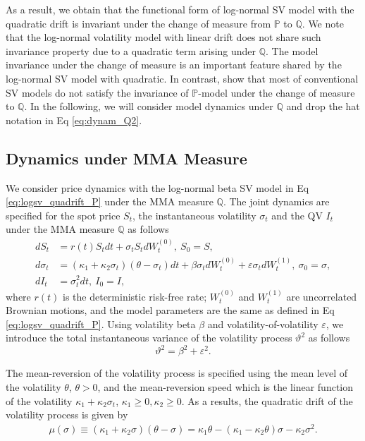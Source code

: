 \documentclass[pdftex,11pt,a4paper] {article}
\begin{document}
As a result, we obtain that the functional form of log-normal SV model with the quadratic drift is invariant under the change of measure from $\mathbb{P}$ to $\mathbb{Q}$. We note that the log-normal volatility model with linear drift does not share such invariance property due to a quadratic term arising under $\mathbb{Q}$. The model invariance under the change of measure is an important feature shared by the log-normal SV model with quadratic. In contrast, \cite{SeppRakhmonov2023} show that most of conventional SV models do not satisfy the invariance of $\mathbb{P}$-model under the change of measure to $\mathbb{Q}$. In the following, we will consider model dynamics under $\mathbb{Q}$ and drop the hat notation in Eq \eqref{eq:dynam_Q2}.



\subsection{Dynamics under MMA Measure}

We consider price dynamics with the log-normal beta SV model in Eq \eqref{eq:logsv_quadrift_P} under the MMA measure $\mathbb{Q}$. The joint dynamics are specified for the spot price $S_{t}$, the instantaneous volatility $\sigma_{t}$ and the QV $I_{t}$ under the MMA measure $\mathbb{Q}$ as follows
\begin{equation} \label{eq:svmd1}
\begin{split}
dS_{t}&=r(t)S_{t}dt+\sigma_{t}S_{t}dW^{(0)}_{t}, \ S_{0} =S, \\
d\sigma_{t}& =\left(\kappa_{1} + \kappa_{2}\sigma_{t} \right)(\theta - \sigma_{t})dt+  \beta  \sigma_{t}dW^{(0)}_{t} +  \varepsilon \sigma_{t} dW^{(1)}_{t}, \ \sigma_{0}=\sigma, \\
dI_{t}&=\sigma^{2}_{t}dt, \ I_{0}=I,
\end{split}
\end{equation}
where $r(t)$ is the deterministic risk-free rate; $W^{(0)}_{t}$ and $W^{(1)}_t$  are uncorrelated Brownian motions, and the model parameters are the same as defined in Eq \eqref{eq:logsv_quadrift_P}. Using volatility beta $\beta$ and volatility-of-volatility $\varepsilon$, we introduce the total instantaneous variance of the volatility process $\vartheta^{2}$ as follows
\begin{equation}\label{eq:vartheta}
 \vartheta^{2}=\beta^{2}+\varepsilon^{2}.
\end{equation}

The mean-reversion of the volatility process is specified using the mean level of the volatility $\theta$, $\theta>0$, and the mean-reversion speed which is the linear function of the volatility $\kappa_{1} + \kappa_{2}\sigma_{t} $,  $\kappa_{1} \geq 0, \kappa_{2} \geq 0$. As a results, the quadratic drift of the volatility process is given by
\begin{equation}\label{eq:tr1}
\begin{split}
\mu\left(\sigma\right) \equiv \left(\kappa_{1} + \kappa_{2}\sigma\right)(\theta - \sigma) =\kappa_{1} \theta - \left(\kappa_{1} - \kappa_{2}\theta \right)\sigma- \kappa_{2}\sigma^{2}.
\end{split}
\end{equation}
\end{document}
